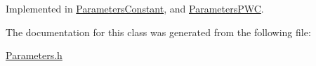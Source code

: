 Implemented in \hyperlink{classParametersConstant_ad5c8d91b72338d7fca8efc71b956d32f}{Parameters\+Constant}, and \hyperlink{classParametersPWC_a3ab6b8a736641290561b5e8a748a6199}{Parameters\+P\+WC}.



The documentation for this class was generated from the following file\+:\begin{DoxyCompactItemize}
\item 
\hyperlink{Parameters_8h}{Parameters.\+h}\end{DoxyCompactItemize}
